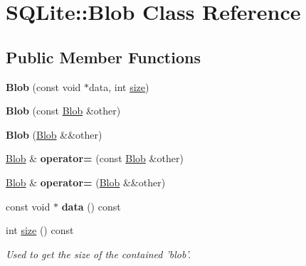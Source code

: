 \hypertarget{class_s_q_lite_1_1_blob}{\section{S\-Q\-Lite\-:\-:Blob Class Reference}
\label{class_s_q_lite_1_1_blob}
}
\subsection*{Public Member Functions}
\begin{DoxyCompactItemize}
\item 
\hypertarget{class_s_q_lite_1_1_blob_a9a12b838ed72118e90f41e256dc7d0ec}{{\bfseries Blob} (const void $\ast$data, int \hyperlink{class_s_q_lite_1_1_blob_a3a1316074209aeea955b8b1bf31e7a78}{size})}\label{class_s_q_lite_1_1_blob_a9a12b838ed72118e90f41e256dc7d0ec}

\item 
\hypertarget{class_s_q_lite_1_1_blob_a4f525d8e11e4361b808692eccb4e12a5}{{\bfseries Blob} (const \hyperlink{class_s_q_lite_1_1_blob}{Blob} \&other)}\label{class_s_q_lite_1_1_blob_a4f525d8e11e4361b808692eccb4e12a5}

\item 
\hypertarget{class_s_q_lite_1_1_blob_ae458297c2b9be504111c7b23636942e0}{{\bfseries Blob} (\hyperlink{class_s_q_lite_1_1_blob}{Blob} \&\&other)}\label{class_s_q_lite_1_1_blob_ae458297c2b9be504111c7b23636942e0}

\item 
\hypertarget{class_s_q_lite_1_1_blob_af34146d8ac8d1414c5ad1673ca05669e}{\hyperlink{class_s_q_lite_1_1_blob}{Blob} \& {\bfseries operator=} (const \hyperlink{class_s_q_lite_1_1_blob}{Blob} \&other)}\label{class_s_q_lite_1_1_blob_af34146d8ac8d1414c5ad1673ca05669e}

\item 
\hypertarget{class_s_q_lite_1_1_blob_ae6409ebce61480b97f01c072f9e49276}{\hyperlink{class_s_q_lite_1_1_blob}{Blob} \& {\bfseries operator=} (\hyperlink{class_s_q_lite_1_1_blob}{Blob} \&\&other)}\label{class_s_q_lite_1_1_blob_ae6409ebce61480b97f01c072f9e49276}

\item 
\hypertarget{class_s_q_lite_1_1_blob_a112b54351792991f10563295e33600e2}{const void $\ast$ {\bfseries data} () const }\label{class_s_q_lite_1_1_blob_a112b54351792991f10563295e33600e2}

\item 
int \hyperlink{class_s_q_lite_1_1_blob_a3a1316074209aeea955b8b1bf31e7a78}{size} () const 
\begin{DoxyCompactList}\small\item\em Used to get the size of the contained 'blob'. \end{DoxyCompactList}\end{DoxyCompactItemize}


